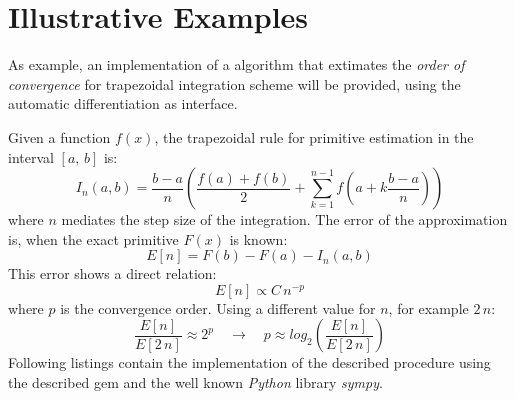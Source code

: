 \section{Illustrative Examples}
\label{sec:examples}


As example, an implementation of a algorithm that extimates the \emph{order of convergence} for trapezoidal integration scheme will be provided, using the automatic differentiation as interface.

Given a function $f(x)$, the trapezoidal rule for primitive estimation in the interval $[a,\,b]$ is:
\begin{equation}
  I_{n}(a, b) = \dfrac{b - a}{n} \left( \dfrac{f(a) + f(b)}{2} +
    \sum\limits_{k = 1}^{n - 1}{f \left( a + k \dfrac{b - a}{n} \right)} \right)
\end{equation}
where $n$ mediates the step size of the integration. The error of the approximation is, when the exact primitive $F(x)$ is known:
\begin{equation}
  E[n] = F(b) - F(a) - I_{n}(a, b)
\end{equation}
This error shows a direct relation:
\begin{equation}
  E[n] \propto C\,{n}^{-p}
\end{equation}
where $p$ is the convergence order. Using a different value for $n$, for example $2\,n$:
\begin{equation}
  \dfrac{E[n]}{E[2\,n]} \approx 2^{p} \quad \rightarrow \quad p \approx log_2 \left( \dfrac{E[n]}{E[2\,n]} \right)
\end{equation}
Following listings contain the implementation of the described procedure using the described gem and the well known \emph{Python} library \emph{sympy}.

\noindent%
  \begin{minipage}{.5\textwidth}
    
  \end{minipage}\hfill
  \begin{minipage}{.5\textwidth}
    
  \end{minipage}
